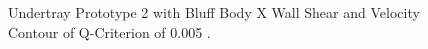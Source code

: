 \begin{figure}[!htb] 
    \centering
    \noindent{}
    \caption{Undertray Prototype 2 with Bluff Body X Wall Shear and Velocity Contour of Q-Criterion of 0.005 .}
      \label{fig:3D_QCRIT_WSHEAR_UTP2}
\end{figure}

